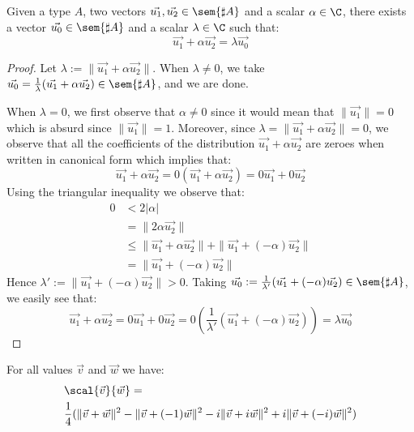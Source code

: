 \begin{lemma}\label{lem:VecRewrite}%
Given a type $A$, two vectors $\vec{u_1},\vec{u_2}\in\sem{\sharp A}$ and a scalar $\alpha\in\C$, there exists a vector $\vec{u_0}\in\sem{\sharp A}$ and a scalar $\lambda\in\C$ such that:
\[
\vec{u_1} + \alpha\vec{u_2} = \lambda \vec{u_0} 
\]
\end{lemma}
\begin{proof}
    Let $\lambda:=\|\vec{u_1}+\alpha\vec{u_2}\|$. When $\lambda\neq 0$, we take $\vec{u_0}=\frac{1}{\lambda}(\vec{u_1}+\alpha\vec{u_2})\in\sem{\sharp A}$, and we are done.

    When $\lambda=0$, we first observe that $\alpha\neq 0$ since it would mean that $\|\vec{u_1}\|=0$ which is absurd since $\|\vec{u_1}\|=1$. Moreover, since $\lambda=\|\vec{u_1}+\alpha\vec{u_2}\|=0$, we observe that all the coefficients of the distribution $\vec{u_1}+\alpha\vec{u_2}$ are zeroes when written in canonical form which implies that:
    \[
    \vec{u_1}+\alpha\vec{u_2} = 0(\vec{u_1}+\alpha\vec{u_2}) = 0\vec{u_1}+0\vec{u_2}
    \]
    Using the triangular inequality we observe that:
    \begin{align*}
    0 &< 2|\alpha|\\
    &= \|2\alpha\vec{u_2}\|\\
    &\leq\|\vec{u_1}+\alpha\vec{u_2}\| + \|\vec{u_1 }+ (-\alpha)\vec{u_2}\|\\
    &= \|\vec{u_1}+(-\alpha)\vec{u_2}\|
    \end{align*}
    Hence $\lambda' := \|\vec{u_1}+(-\alpha)\vec{u_2}\|>0$. Taking $\vec{u_0}:= \frac{1}{\lambda'}(\vec{u_1}+ (-\alpha)\vec{u_2})\in\sem{\sharp A}$, we easily see that:
    \[
    \vec{u_1}+\alpha\vec{u_2} = 0\vec{u_1} + 0\vec{u_2} = 0(\frac{1}{\lambda'} (\vec{u_1} + (-\alpha) \vec{u_2})) = \lambda \vec{u_0}
    \]
\end{proof}

\begin{proposition}\label{prop:Polarization} %
For all values $\vec{v}$ and $\vec{w}$ we have:
\begin{align*}
&\scal{\vec{v}}{\vec{w}}=\\
&\frac{1}{4} (\|\vec{v}+\vec{w}\|^2 - \|\vec{v} + (-1) \vec{w}\|^2 - i\|\vec{v} + i\vec{w}\|^2 + i\|\vec{v}+ (-i)\vec{w}\|^2)
\end{align*}
\end{proposition}

